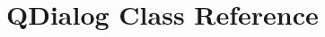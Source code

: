 \hypertarget{classPlayer_1_1QDialog}{}\section{Q\+Dialog Class Reference}
\label{classPlayer_1_1QDialog}
